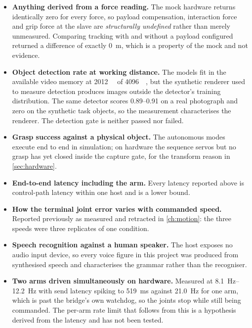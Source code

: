 \begin{itemize}
  \item \textbf{Anything derived from a force reading.} The mock hardware
    returns identically zero for every force, so payload compensation,
    interaction force and grip force at the slave are \emph{structurally
    undefined} rather than merely unmeasured. Comparing tracking with and
    without a payload configured returned a difference of exactly
    \SI{0}{\metre}, which is a property of the mock and not evidence.
  \item \textbf{Object detection rate at working distance.} The models fit in
    the available video memory at \SI{2012}{\mebi\byte} of \SI{4096}{\mebi\byte},
    but the synthetic renderer used to measure detection produces images
    outside the detector's training distribution. The same detector scores
    \numrange{0.89}{0.91} on a real photograph and zero on the synthetic task
    objects, so the measurement characterises the renderer. The detection gate
    is neither passed nor failed.
  \item \textbf{Grasp success against a physical object.} The autonomous
    modes execute end to end in simulation; on hardware the sequence servos
    but no grasp has yet closed inside the capture gate, for the transform
    reason in \cref{sec:hardware}.
  \item \textbf{End-to-end latency including the arm.} Every latency reported
    above is control-path latency within one host and is a lower bound.
  \item \textbf{How the terminal joint error varies with commanded speed.}
    Reported previously as measured and retracted in \cref{ch:motion}: the
    three speeds were three replicates of one condition.
  \item \textbf{Speech recognition against a human speaker.} The host exposes
    no audio input device, so every voice figure in this project was produced
    from synthesised speech and characterises the grammar rather than the
    recogniser.
  \item \textbf{Two arms driven simultaneously on hardware.} Measured at
    \SIrange{8.1}{12.2}{\hertz} with send latency spiking to
    \SI{519}{\milli\second} against \SI{21.0}{\hertz} for one arm, which is
    past the bridge's own watchdog, so the joints stop while still being
    commanded. The per-arm rate limit that follows from this is a hypothesis
    derived from the latency and has not been tested.
\end{itemize}

